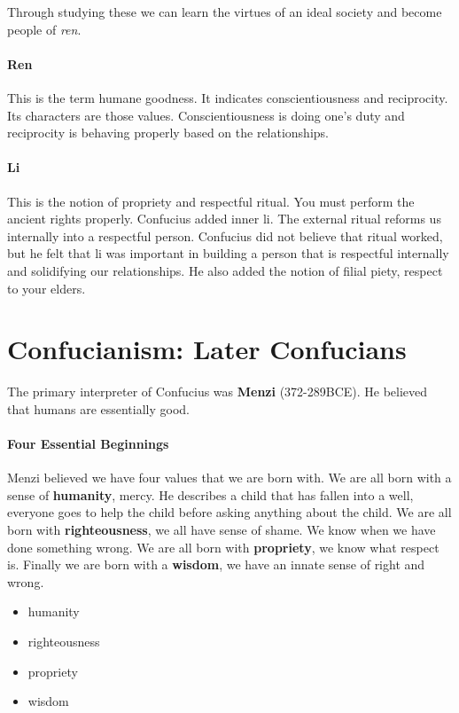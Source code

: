 \documentclass{article}
\begin{document}
Through studying these we can learn the virtues of an ideal society and become people of \emph{ren}.

\paragraph{Ren}
\label{par:ren}
This is the term humane goodness. It indicates conscientiousness and reciprocity. Its characters are those values. Conscientiousness is doing one's duty and reciprocity is behaving properly based on the relationships.

\paragraph{Li}
\label{par:li}
This is the notion of propriety and respectful ritual. You must perform the ancient rights properly. Confucius added inner li. The external ritual reforms us internally into a respectful person. Confucius did not believe that ritual worked, but he felt that li was important in building a person that is respectful internally and solidifying our relationships. He also added the notion of filial piety, respect to your elders.

\section*{Confucianism: Later Confucians}
\label{sec:confucianism_later_confucians}
The primary interpreter of Confucius was \textbf{Menzi} (372-289BCE). He believed that humans are essentially good.

\paragraph{Four Essential Beginnings}
\label{par:four_essential_beginnings}
Menzi believed we have four values that we are born with. We are all born with a sense of \textbf{humanity}, mercy. He describes a child that has fallen into a well, everyone goes to help the child before asking anything about the child. We are all born with \textbf{righteousness}, we all have sense of shame. We know when we have done something wrong. We are all born with \textbf{propriety}, we know what respect is. Finally we are born with a \textbf{wisdom}, we have an innate sense of right and wrong.
\begin{itemize}
	\item humanity
	\item righteousness
	\item propriety
	\item wisdom
\end{itemize}
\end{document}
